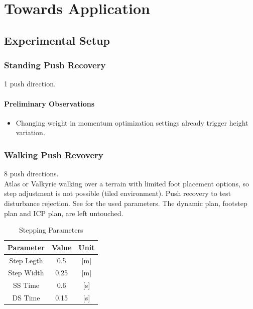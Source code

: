 %
\chapter{Towards Application}

\section{Experimental Setup}

\subsection{Standing Push Recovery}
1 push direction.\\
\subsubsection{Preliminary Observations}
\begin{itemize}
	\item Changing weight in momentum optimization settings already trigger height variation.
\end{itemize}

\subsection{Walking Push Revovery}
8 push directions.\\
Atlas or Valkyrie walking over a terrain with limited foot placement options, so step adjustment is not possible (tiled environment). Push recovery to test disturbance rejection. See  for the used parameters. The dynamic plan, footstep plan and \ac{ICP} plan, are left untouched.
\begin{table}[ht]
\caption{Stepping Parameters} %
\centering %
\begin{tabular}{c c c } %
\hline\hline %
Parameter & Value & Unit \\
\hline %
Step Legth & 0.5 &  [m]\\
Step Width & 0.25 & [m]\\
\acs{SS} Time & 0.6 & [s]\\
\acs{DS} Time & 0.15 & [s]\\
\hline %
\end{tabular}
\label{tab:stepping} %
\end{table}
